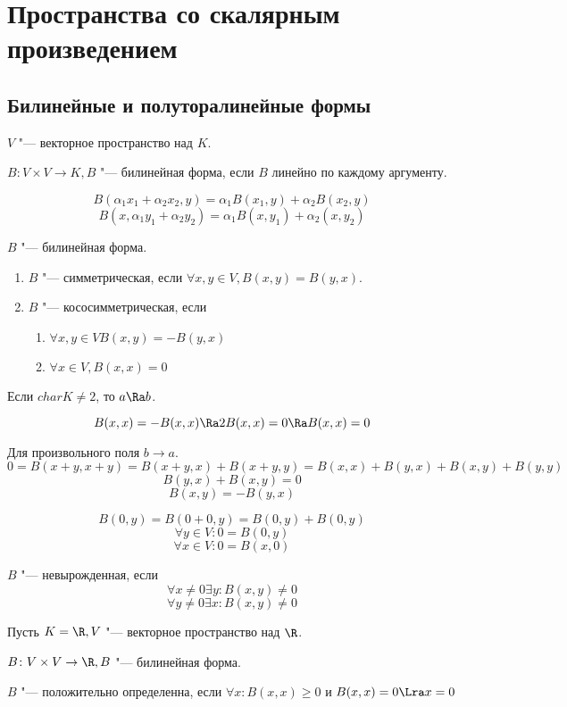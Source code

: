\chapter{Пространства со скалярным произведением}
\section{Билинейные и полуторалинейные формы}
\begin{Def}
$V$ "--- векторное пространство над $K$. 

$B \colon V \times V \to K, B$ "--- билинейная форма, 
если $B$ линейно по каждому аргументу.

$$B(\alpha_1 x_1 + \alpha_2 x_2, y) = \alpha_1 B(x_1, y) + \alpha_2 B(x_2, y)$$
$$B(x, \alpha_1y_1 + \alpha_2 y_2) = \alpha_1 B(x, y_1) + \alpha_2(x, y_2)$$
\end{Def}
\begin{Def}
$B$ "--- билинейная форма.
    \begin{enumerate}
    \item $B$ "--- симметрическая, если $\forall x, y \in V, B(x, y) = B(y, x)$.
    \item $B$ "--- кососимметрическая, если 
        \begin{enumerate}
        \item $\forall x, y \in V B(x, y) = -B(y, x)$
        \item $\forall x \in V, B(x, x) = 0$
        \end{enumerate}
    \end{enumerate}
\end{Def}
\begin{Rem}
Если $char K \ne 2$, то  $a \Ra b$.

$$B(x, x) = -B(x, x) \Ra 2B(x, x) = 0 \Ra B(x, x) = 0$$
\end{Rem}
\begin{Rem}
Для произвольного поля $b \to a$.
$$0 = B(x + y, x + y) = B(x + y, x) + B(x + y, y) = B(x, x) + B(y, x) + B(x, y) + B(y, y)$$
$$B(y, x) + B(x, y) = 0$$
$$B(x, y) = -B(y, x)$$
\end{Rem}

$$B(0, y) = B(0 + 0, y) = B(0, y) + B(0, y)$$
$$\forall y \in V \colon 0 = B(0, y)$$
$$\forall x \in V \colon 0 = B(x, 0)$$

\begin{Def}
$B$ "--- невырожденная, если 
$$\forall x \ne 0 \exists y \colon B(x, y) \ne 0$$
$$\forall y \ne 0 \exists x \colon B(x, y) \ne 0$$
\end{Def}
\begin{Def}
Пусть $K = \R, V$ "--- векторное пространство над $\R$.

$B \colon V \times V \to \R, B$ "--- билинейная форма.

$B$ "--- положительно определенна, если 
$\forall x\colon B(x, x) \ge 0$ и $B(x, x) = 0 \Lra x = 0$
\end{Def}

